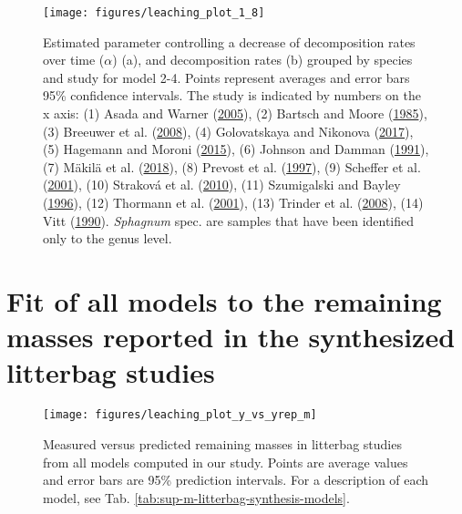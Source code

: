 \documentclass[
  12pt,
]{article}
\begin{document}
\begin{figure}[H]

{\centering \texttt{[image: figures/leaching\_plot\_1\_8]} 

}

\caption{Estimated parameter controlling a decrease of decomposition rates over time (\(\alpha\)) (a), and decomposition rates (b) grouped by species and study for model 2-4. Points represent averages and error bars 95\% confidence intervals. The study is indicated by numbers on the x axis: (1) Asada and Warner (\protect\hyperlink{ref-Asada.2005b}{2005}), (2) Bartsch and Moore (\protect\hyperlink{ref-Bartsch.1985}{1985}), (3) Breeuwer et al. (\protect\hyperlink{ref-Breeuwer.2008}{2008}), (4) Golovatskaya and Nikonova (\protect\hyperlink{ref-Golovatskaya.2017}{2017}), (5) Hagemann and Moroni (\protect\hyperlink{ref-Hagemann.2015}{2015}), (6) Johnson and Damman (\protect\hyperlink{ref-Johnson.1991}{1991}), (7) Mäkilä et al. (\protect\hyperlink{ref-Makila.2018}{2018}), (8) Prevost et al. (\protect\hyperlink{ref-Prevost.1997}{1997}), (9) Scheffer et al. (\protect\hyperlink{ref-Scheffer.2001}{2001}), (10) Straková et al. (\protect\hyperlink{ref-Strakova.2010}{2010}), (11) Szumigalski and Bayley (\protect\hyperlink{ref-Szumigalski.1996}{1996}), (12) Thormann et al. (\protect\hyperlink{ref-Thormann.2001}{2001}), (13) Trinder et al. (\protect\hyperlink{ref-Trinder.2008}{2008}), (14) Vitt (\protect\hyperlink{ref-Vitt.1990}{1990}). \emph{Sphagnum} spec. are samples that have been identified only to the genus level.}\label{fig:sup-out-mm-p5-1-8}
\end{figure}

\hypertarget{sup-8}{%
\section{Fit of all models to the remaining masses reported in the synthesized litterbag studies}\label{sup-8}}



\begin{figure}[H]

{\centering \texttt{[image: figures/leaching\_plot\_y\_vs\_yrep\_m]} 

}

\caption{Measured versus predicted remaining masses in litterbag studies from all models computed in our study. Points are average values and error bars are 95\% prediction intervals. For a description of each model, see Tab. \ref{tab:sup-m-litterbag-synthesis-models}.}\label{fig:sup-out-sdm-all-models-p1}
\end{figure}
\end{document}
